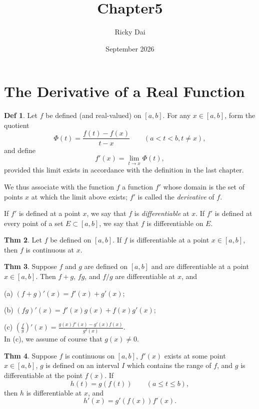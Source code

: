 \documentclass{article}
\title{Chapter5}
\author{Ricky Dai}
\date{September 2026}
\theoremstyle{definition}
\newtheorem{definition}{Def}
\newtheorem{theorem}[definition]{Thm}
\begin{document}
\maketitle
\section{The Derivative of a Real Function}
\begin{definition}
    Let $f$ be defined (and real-valued) on $[a, b]$. For any $x\in [a,b]$, form the quotient
    \[
    \Phi(t)=\frac{f(t)-f(x)}{t-x} \qquad (a<t<b, t\neq x),
    \]
    and define
    \[
    f'(x)=\lim_{t\to x} \Phi(t),
    \]
    provided this limit exists in accordance with the definition in the last chapter.\par
    We thus associate with the function $f$ a function $f'$ whose domain is the set of points $x$ at which the limit above exists; $f'$ is called the \textit{derivative} of $f$.\par
    If $f'$ is defined at a point $x$, we say that $f$ is \textit{differentiable} at $x$. If $f'$ is defined at every point of a set $E\subset [a,b]$, we say that $f$ is differentiable on $E$.
\end{definition}
\begin{theorem}
    Let $f$ be defined on $[a, b]$. If $f$ is differentiable at a point $x\in [a,b]$, then $f$ is continuous at $x$.
\end{theorem}
\begin{theorem}
    Suppose $f$ and $g$ are defined on $[a,b]$ and are differentiable at a point $x\in [a,b]$. Then $f+g$, $fg$, and $f/g$ are differentiable at $x$, and\par
    (a) $(f+g)'(x)=f'(x)+g'(x)$;\par
    (b) $(fg)'(x)=f'(x)g(x)+f(x)g'(x)$;\par
    (c) $(\frac{f}{g})'(x)=\frac{g(x)f'(x)-g'(x)f(x)}{g^2(x)}$.\\
    In (c), we assume of course that $g(x)\neq 0$.
\end{theorem}
\begin{theorem}
    Suppose $f$ is continuous on $[a,b]$, $f'(x)$ exists at some point $x\in [a,b]$, $g$ is defined on an interval $I$ which contains the range of $f$, and $g$ is differentiable at the point $f(x)$. If
    \[
    h(t)=g(f(t))\qquad (a\leq t\leq b),
    \]
    then $h$ is differentiable at $x$, and
    \[
    h'(x)=g'(f(x))f'(x).
    \]
\end{theorem}
\end{document}
